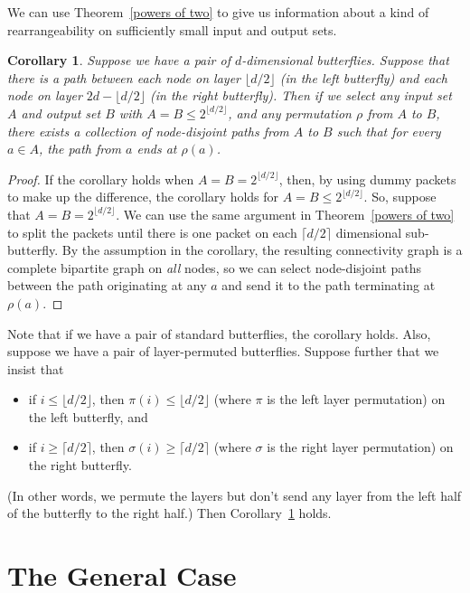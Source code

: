 \documentclass[12pt]{article}
\newtheorem{corollary}{Corollary}
\begin{document}
We can use Theorem~\ref{powers of two} to give us information about
a kind of rearrangeability on sufficiently small input and output sets.
\begin{corollary} \label{mini-rearrangeability}
Suppose we have a pair of $d$-dimensional butterflies.
Suppose that there is a path between each node on layer 
$\lfloor d/2 \rfloor$ (in the left butterfly) and each node
on layer $2d - \lfloor d/2 \rfloor$ (in the right butterfly).
Then if we select any input set $A$ and output set $B$ with
$A=B \leq 2^{\lfloor d/2 \rfloor}$,  and any permutation $\rho$ from
$A$ to $B$, there exists a collection of node-disjoint paths
from $A$ to $B$ such that for every $a \in A$, the path from $a$
ends at $\rho(a)$.
\end{corollary}
\begin{proof}
If the corollary holds when $A=B = 2^{\lfloor d/2 \rfloor}$, then,
by using dummy packets to make up the difference, the corollary 
holds for $A=B \leq 2^{\lfloor d/2 \rfloor}$.  So, suppose that 
$A=B = 2^{\lfloor d/2 \rfloor}$.  We can use the same argument in
Theorem~\ref{powers of two} to split the packets until there is one
packet on each $\lceil d/2 \rceil$ dimensional sub-butterfly.
By the assumption in the corollary, the resulting connectivity graph
is a complete bipartite graph on \emph{all} nodes, so we can select
node-disjoint paths between the path originating at any $a$ and
send it to the path terminating at $\rho(a)$.\end{proof}

Note that if we have a pair of standard butterflies, the corollary holds.
Also, suppose we have a pair of layer-permuted butterflies.
Suppose further that we insist that
\begin{itemize}
\item  if $i \leq \lfloor d/2 \rfloor$, then 
$\pi(i) \leq \lfloor d/2 \rfloor$ (where $\pi$ is the left layer permutation)
 on the left butterfly, and
\item
 if $i \geq \lceil d/2 \rceil$, then 
$\sigma(i) \geq \lceil d/2 \rceil$ (where $\sigma$ is the right layer 
permutation) on the right butterfly.
\end{itemize}
(In other words, we permute the layers but don't send any layer from the
left half of the butterfly to the right half.)
Then Corollary~\ref{mini-rearrangeability} holds.

\section{The General Case}
\end{document}
